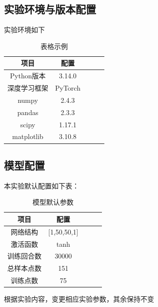 \subsection{实验环境与版本配置}
实验环境如下
\begin{table}[htbp]
  \centering
  \caption{表格示例}
    \begin{tabular}{ccccc}
    \toprule
    项目 & 配置 \\
    \midrule
    Python版本  & 3.14.0 \\
    深度学习框架  & PyTorch \\
    numpy  & 2.4.3 \\
    pandas  & 2.3.3 \\
    scipy & 1.17.1 \\
    matplotlib & 3.10.8 \\
    \bottomrule
    \end{tabular}%
  \label{Tab4-1}%
\end{table}%

\subsection{模型配置}
本实验默认配置如下表：
\begin{table}[htbp]
  \centering
  \caption{模型默认参数}
    \begin{tabular}{ccccc}
    \toprule
    项目 & 配置 \\
    \midrule
      网络结构 & [1,50,50,1] \\
      激活函数 & tanh \\
      训练回合数 & 30000 \\
      总样本点数 & 151 \\
      训练点数 & 75 \\
    \bottomrule
    \end{tabular}%
  \label{Tab4-1}%
\end{table}%

根据实验内容，变更相应实验参数，其余保持不变